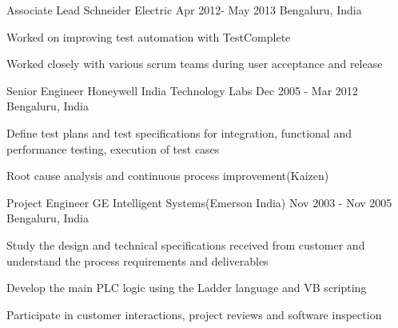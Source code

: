 \documentclass[11pt, a4paper]{awesome-cv}
\begin{document}
\begin{cventries}
    \cventry
      {Associate Lead}
      {Schneider Electric}
      {Apr 2012- May 2013}
      {Bengaluru, India}
      {
        \begin{cvitems}
          \item Worked on improving test automation with TestComplete
          \item Worked closely with various scrum teams during user acceptance and release
          \end{cvitems}
      }

    \cventry
      {Senior Engineer}
      {Honeywell India Technology Labs}
      {Dec 2005 - Mar 2012}
      {Bengaluru, India}
      {
        \begin{cvitems}
        \item Define test plans and test specifications for integration, functional and performance testing, execution of test cases
        \item Root cause analysis and continuous process improvement(Kaizen)
        \end{cvitems}
      }

    \cventry
      {Project Engineer}
      {GE Intelligent Systems(Emerson India)}
      {Nov 2003 - Nov 2005}
      {Bengaluru, India}
      {
        \begin{cvitems}
        \item Study the design and technical specifications received from customer and understand the process requirements and deliverables
        \item Develop the main PLC logic using the Ladder language and VB scripting
        \item Participate in customer interactions, project reviews and software inspection
        \end{cvitems}
      }
  \end{cventries}

\end{document}
